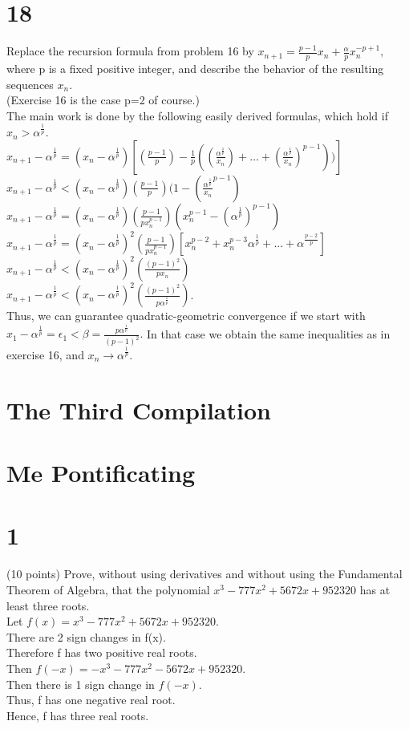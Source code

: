 \section*{18}
Replace the recursion formula from problem 16 by $x_{n+1}=\frac{p-1}{p}x_n + \frac{\alpha}{p}x_n^{-p+1},$ where p is a fixed positive integer, and describe the behavior of the resulting sequences ${x_n}.$ \\ 
(Exercise 16 is the case p=2 of course.) \\ 
The main work is done by the following easily derived formulas, which hold if $x_n > \alpha ^\frac{1}{p}.$ \\ 
$x_{n+1}- \alpha ^\frac{1}{p}= (x_n - \alpha^ \frac{1}{p})[(\frac{p-1}{p})-\frac{1}{p}((\frac{\alpha^\frac{1}{p}}{x_n})+ \dots + (\frac{\alpha^\frac{1}{p}}{x_n})^{p-1}))]$\\ 
$x_{n+1}- \alpha ^\frac{1}{p}< (x_n- \alpha ^\frac{1}{p})(\frac{p-1}{p})(1-(\frac{\alpha^\frac{1}{p}}{x_n}^{p-1}) $ \\ 
$x_{n+1}- \alpha ^\frac{1}{p}= (x_n- \alpha ^\frac{1}{p})(\frac{p-1}{px_n^{p-1}})(x_n^{p-1}-(\alpha ^\frac{1}{p})^{p-1})$ \\ 
$x_{n+1}- \alpha ^\frac{1}{p}= (x_n- \alpha ^\frac{1}{p})^2 (\frac{p-1}{px_n^{p-1}})[x_n^{p-2}+x_n^{p-3}\alpha ^\frac{1}{p}+ ...+ \alpha^ \frac{p-2}{p}]$ \\ 
$x_{n+1}- \alpha ^\frac{1}{p}< (x_n- \alpha ^\frac{1}{p})^2 (\frac{(p-1)^2}{p x_n})$ \\ 
$x_{n+1}- \alpha ^\frac{1}{p}< (x_n- \alpha ^\frac{1}{p})^2 (\frac{(p-1)^2}{p \alpha ^\frac{1}{p}})$. \\ 
Thus, we can guarantee quadratic-geometric convergence if we start with $x_1 - \alpha ^\frac{1}{p}= \epsilon_1 < \beta = \frac{p \alpha ^ \frac{1}{p}}{(p-1)^2}.$ In that case we obtain the same inequalities as in exercise 16, and $x_n \longrightarrow \alpha ^\frac{1}{p}.$

\section{The Third Compilation}
\section*{Me Pontificating}

\section*{1}
(10 points) Prove, without using derivatives and without using the Fundamental Theorem of Algebra, that the polynomial $x^3-777x^2+5672x+952320$ has at least three roots. 
\\
Let $f(x)=x^3-777x^2+5672x+952320.$ \\ 
There are 2 sign changes in f(x). \\ 
Therefore f has two positive real roots. \\ 
Then $f(-x)=-x^3-777x^2-5672x+952320.$\\ 
Then there is 1 sign change in $f(-x).$ \\ 
Thus, f has one negative real root. \\ 
Hence, f has three real roots. 
